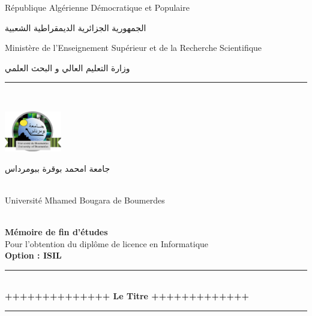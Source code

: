 \documentclass[a4paper,12pt]{report}
\begin{document}
\begin{titlepage}
    \centering
    {\small République Algérienne Démocratique et Populaire}\\
    \begin{Arabic}
    الجمهورية الجزائرية الديمقراطية الشعبية \\
	\end{Arabic}
    {\small Ministère de l'Enseignement Supérieur et de la Recherche Scientifique}\\
        \begin{Arabic}
        وزارة التعليم العالي و البحث العلمي \\
	\end{Arabic}
\rule{\linewidth}{0.3mm} \\[0.4cm]

\begin{minipage}{5cm}
	\begin{center}
		\includegraphics[width=2.5cm]{Logo_umbb.png}
	\end{center}
\end{minipage}\hfill
\begin{minipage}{10cm}
	\begin{flushright}
	\begin{Arabic}
	جامعة امحمد بوقرة ببومرداس
	\end{Arabic}\\
	{\small Université Mhamed Bougara de Boumerdes}\\[0.1cm]

	\end{flushright}
\end{minipage}\hfill\\
\vspace{20mm}
{\large \bfseries Mémoire de fin d’études}\\[0.5cm]
{\large Pour l'obtention du diplôme de licence en Informatique}\\[0.5cm]
{\large \bfseries{Option : ISIL} \\ }
\vspace{10mm}
\rule{\linewidth}{0.3mm} \\[0.4cm]
{ \huge \bfseries ++++++++++++++ Le Titre +++++++++++++\\[0.4cm] }
\rule{\linewidth}{0.3mm} \\[1cm]
\vspace{10mm}


\end{titlepage}
\end{document}
